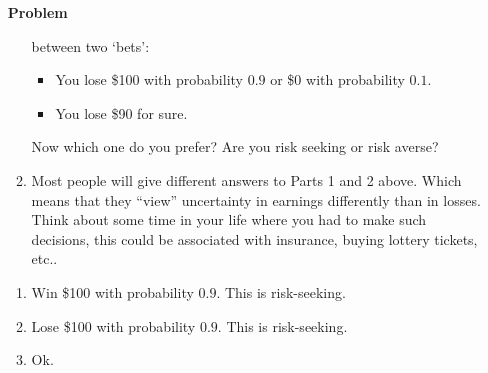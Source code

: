 \documentclass[12pt]{article}
\newenvironment{Ex}{\textbf{Problem}\vspace{.75em}\\}{}
\begin{document}
\begin{enumerate}
\begin{Ex}
\begin{enumerate}
        between two `bets':
        \begin{itemize}
        \item You lose \$100 with probability $0.9$ or \$0 with
          probability $0.1$.
        \item You lose \$90 for sure.
        \end{itemize}
        Now which one do you prefer? Are you risk seeking or risk averse?
      \item Most people will give different answers to Parts 1 and 2
        above. Which means that they ``view'' uncertainty in earnings
        differently than in losses. Think about some time in your life
        where you had to make such decisions, this could be associated
        with insurance, buying lottery tickets, etc..
      \end{enumerate}
      \begin{solution} \hfill
        \begin{enumerate}
        \item Win \$100 with probability $0.9$. This is risk-seeking.
        \item Lose \$100 with probability $0.9$. This is risk-seeking.
        \item Ok.
        \end{enumerate}
      \end{solution}
    \end{Ex}
  \end{enumerate}
\end{document}
